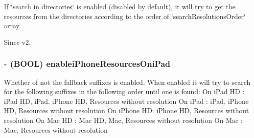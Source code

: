If \char`\"{}search in directories\char`\"{} is enabled (disabled by default), it will try to get the resources from the directories according to the order of \char`\"{}search\-Resolutions\-Order\char`\"{} array. \begin{DoxySince}{Since}
v2. 
\end{DoxySince}
\hypertarget{class_c_c_file_utils_a68414e5d5e79c3b51b728ce484b281ef}{
\subsubsection[{enablei\-Phone\-Resources\-Oni\-Pad}]{\setlength{\rightskip}{0pt plus 5cm}-\/ (B\-O\-O\-L) {\bf enablei\-Phone\-Resources\-Oni\-Pad}}}\label{class_c_c_file_utils_a68414e5d5e79c3b51b728ce484b281ef}
Whether of not the fallback suffixes is enabled. When enabled it will try to search for the following suffixes in the following order until one is found\-: On i\-Pad H\-D \-: i\-Pad H\-D, i\-Pad, i\-Phone H\-D, Resources without resolution On i\-Pad \-: i\-Pad, i\-Phone H\-D, Resources without resolution On i\-Phone H\-D\-: i\-Phone H\-D, Resources without resolution On Mac H\-D \-: Mac H\-D, Mac, Resources without resolution On Mac \-: Mac, Resources without resolution

